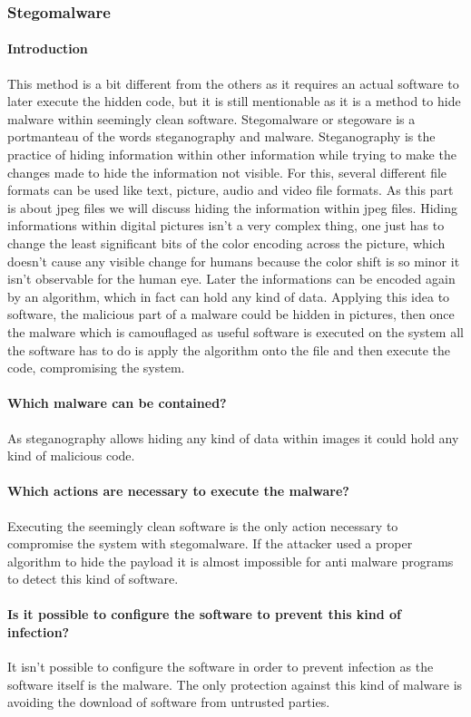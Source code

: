\documentclass[a4paper,10pt]{article}
\begin{document}
\subsubsection{Stegomalware}
\paragraph*{Introduction}
This method is a bit different from the others as it requires an actual software to later execute the hidden code, but it is still mentionable as it is a method to hide malware within seemingly clean software. Stegomalware or stegoware is a portmanteau of the words steganography and malware. Steganography is the practice of hiding information within other information while trying to make the changes made to hide the information not visible. For this, several different file formats can be used like text, picture, audio and video file formats. As this part is about jpeg files we will discuss hiding the information within jpeg files. Hiding informations within digital pictures isn't a very complex thing, one just has to change the least significant bits of the color encoding across the picture, which doesn't cause any visible change for humans because the color shift is so minor it isn't observable for the human eye. Later the informations can be encoded again by an algorithm, which in fact can hold any kind of data. Applying this idea to software, the malicious part of a malware could be hidden in pictures, then once the malware which is camouflaged as useful software is executed on the system all the software has to do is apply the algorithm onto the file and then execute the code, compromising the system.\cite{inproceedings}
\paragraph*{Which malware can be contained?}
As steganography allows hiding any kind of data within images it could hold any kind of malicious code.
\paragraph*{Which actions are necessary to execute the malware?}
Executing the seemingly clean software is the only action necessary to compromise the system with stegomalware. If the attacker used a proper algorithm to hide the payload it is almost impossible for anti malware programs to detect this kind of software.
\paragraph*{Is it possible to configure the software to prevent this kind of infection?}
It isn't possible to configure the software in order to prevent infection as the software itself is the malware. The only protection against this kind of malware is avoiding the download of software from untrusted parties.
\end{document}
